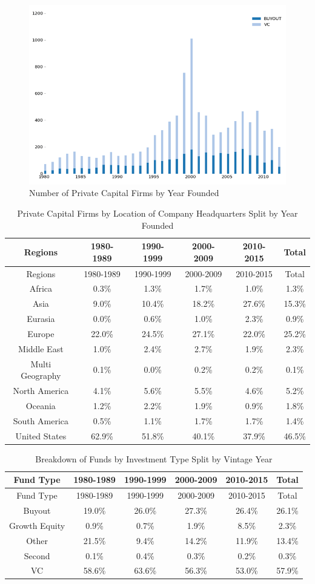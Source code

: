 \documentclass[
]{WileySix}
\begin{document}
\begin{figure}
\includegraphics[width=1\linewidth]{./assets/pcri/pcrifigurea1web} \caption{Number of Private Capital Firms by Year Founded}\label{fig:pcrifigurea1}
\end{figure}

\begin{longtable}[]{@{}cccccc@{}}
\caption{\label{tab:pcritablea1} Private Capital Firms by Location of Company Headquarters Split by Year Founded}\tabularnewline
\toprule
Regions & 1980-1989 & 1990-1999 & 2000-2009 & 2010-2015 & Total\tabularnewline
\midrule
\endfirsthead
\toprule
Regions & 1980-1989 & 1990-1999 & 2000-2009 & 2010-2015 & Total\tabularnewline
\midrule
\endhead
Africa & 0.3\% & 1.3\% & 1.7\% & 1.0\% & 1.3\%\tabularnewline
Asia & 9.0\% & 10.4\% & 18.2\% & 27.6\% & 15.3\%\tabularnewline
Eurasia & 0.0\% & 0.6\% & 1.0\% & 2.3\% & 0.9\%\tabularnewline
Europe & 22.0\% & 24.5\% & 27.1\% & 22.0\% & 25.2\%\tabularnewline
Middle East & 1.0\% & 2.4\% & 2.7\% & 1.9\% & 2.3\%\tabularnewline
Multi Geography & 0.1\% & 0.0\% & 0.2\% & 0.2\% & 0.1\%\tabularnewline
North America & 4.1\% & 5.6\% & 5.5\% & 4.6\% & 5.2\%\tabularnewline
Oceania & 1.2\% & 2.2\% & 1.9\% & 0.9\% & 1.8\%\tabularnewline
South America & 0.5\% & 1.1\% & 1.7\% & 1.7\% & 1.4\%\tabularnewline
United States & 62.9\% & 51.8\% & 40.1\% & 37.9\% & 46.5\%\tabularnewline
\bottomrule
\end{longtable}

\begin{longtable}[]{@{}cccccc@{}}
\caption{\label{tab:pcritablea2} Breakdown of Funds by Investment Type Split by Vintage Year}\tabularnewline
\toprule
Fund Type & 1980-1989 & 1990-1999 & 2000-2009 & 2010-2015 & Total\tabularnewline
\midrule
\endfirsthead
\toprule
Fund Type & 1980-1989 & 1990-1999 & 2000-2009 & 2010-2015 & Total\tabularnewline
\midrule
\endhead
Buyout & 19.0\% & 26.0\% & 27.3\% & 26.4\% & 26.1\%\tabularnewline
Growth Equity & 0.9\% & 0.7\% & 1.9\% & 8.5\% & 2.3\%\tabularnewline
Other & 21.5\% & 9.4\% & 14.2\% & 11.9\% & 13.4\%\tabularnewline
Second & 0.1\% & 0.4\% & 0.3\% & 0.2\% & 0.3\%\tabularnewline
VC & 58.6\% & 63.6\% & 56.3\% & 53.0\% & 57.9\%\tabularnewline
\bottomrule
\end{longtable}
\end{document}

